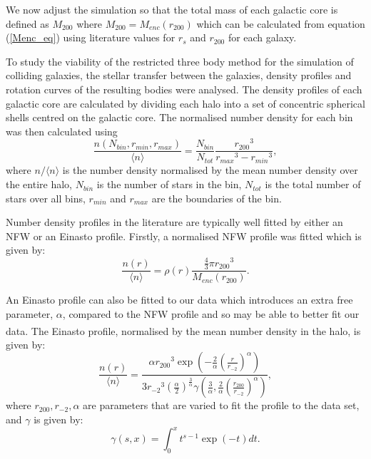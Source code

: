 \documentclass[10pt, twocolumn]{revtex4}    %
\begin{document}
We now adjust the simulation so that the total mass of each galactic core is defined as $M_{200}$ where $M_{200}=M_{enc}(r_{200})$ which can be calculated from equation (\ref{Menc_eq}) using literature values for $r_s$ and $r_{200}$ for each galaxy.

To study the viability of the restricted three body method for the simulation of colliding galaxies, the stellar transfer between the galaxies, density profiles and rotation curves of the resulting bodies were analysed. The density profiles of each galactic core are calculated by dividing each halo into a set of concentric spherical shells centred on the galactic core. The normalised number density for each bin was then calculated using
\begin{equation}
\frac{n(N_{bin},r_{min},r_{max})}{\langle n\rangle} = \frac{N_{bin}}{N_{tot}}\frac{r_{200}{}^3}{r_{max}{}^3-r_{min}{}^3},
\label{ndensitybin_eq}
\end{equation}
where $n/\langle n\rangle$ is the number density normalised by the mean number density over the entire halo, $N_{bin}$ is the number of stars in the bin, $N_{tot}$ is the total number of stars over all bins, $r_{min}$ and $r_{max}$ are the boundaries of the bin.

Number density profiles in the literature are typically well fitted by either an NFW or an Einasto profile. Firstly, a normalised NFW profile was fitted which is given by:
\begin{equation}
\frac{n(r)}{\langle n\rangle}=\rho(r)\frac{\frac{4}{3}\pi r_{200}{}^3}{M_{enc}(r_{200})}.
\label{normNFW_eq}
\end{equation}

An Einasto profile can also be fitted to our data which introduces an extra free parameter, $\alpha$, compared to the NFW profile and so may be able to better fit our data.\textsuperscript{\cite{EinastoConstructionCompositeModel1965}\cite{NavarroinnerstructureLCDM2004}\cite{Newtontotalsatellitepopulation2017}} The Einasto profile, normalised by the mean number density in the halo, is given by:
\begin{equation}
\frac{n(r)}{\langle n\rangle} = \frac{\alpha r_{200}{}^3 \exp\left(-\frac{2}{\alpha}\left( \frac{r}{r_{-2}} \right)^\alpha\right)}{3r_{-2}{}^3 \left( \frac{\alpha}{2} \right)^{\frac{3}{\alpha}}\gamma \left(\frac{3}{\alpha},\frac{2}{\alpha}\left(\frac{r_{200}}{r_{-2}}\right)^{\alpha}\right)},
\label{normedeinasto_eq}
\end{equation}
where $r_{200},r_{-2},\alpha$ are parameters that are varied to fit the profile to the data set, and $\gamma$ is given by:
\begin{equation}
\gamma(s,x)=\int_0^xt^{s-1}\exp(-t)dt.
\end{equation}
\end{document}
